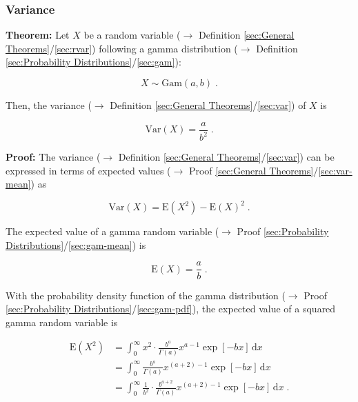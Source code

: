 \documentclass[a4paper,12pt,twoside]{book}
\begin{document}
\subsubsection[\textbf{Variance}]{Variance} \label{sec:gam-var}
\setcounter{equation}{0}

\textbf{Theorem:} Let $X$ be a random variable ($\rightarrow$ Definition \ref{sec:General Theorems}/\ref{sec:rvar}) following a gamma distribution ($\rightarrow$ Definition \ref{sec:Probability Distributions}/\ref{sec:gam}):

\begin{equation} \label{eq:gam-var-gam}
X \sim \mathrm{Gam}(a, b) \; .
\end{equation}

Then, the variance ($\rightarrow$ Definition \ref{sec:General Theorems}/\ref{sec:var}) of $X$ is

\begin{equation} \label{eq:gam-var-gam-var}
\mathrm{Var}(X) = \frac{a}{b^2} \; .
\end{equation}


\vspace{1em}
\textbf{Proof:} The variance ($\rightarrow$ Definition \ref{sec:General Theorems}/\ref{sec:var}) can be expressed in terms of expected values ($\rightarrow$ Proof \ref{sec:General Theorems}/\ref{sec:var-mean}) as

\begin{equation} \label{eq:gam-var-var-mean}
\mathrm{Var}(X) = \mathrm{E}(X^2) - \mathrm{E}(X)^2 \; .
\end{equation}

The expected value of a gamma random variable ($\rightarrow$ Proof \ref{sec:Probability Distributions}/\ref{sec:gam-mean}) is

\begin{equation} \label{eq:gam-var-gam-mean}
\mathrm{E}(X) = \frac{a}{b} \; .
\end{equation}

With the probability density function of the gamma distribution ($\rightarrow$ Proof \ref{sec:Probability Distributions}/\ref{sec:gam-pdf}), the expected value of a squared gamma random variable is

\begin{equation} \label{eq:gam-var-gam-sqr-mean-s1}
\begin{split}
\mathrm{E}(X^2) &= \int_{0}^{\infty} x^2 \cdot \frac{b^a}{\Gamma(a)} x^{a-1} \exp[-b x] \, \mathrm{d}x \\
&= \int_{0}^{\infty} \frac{b^a}{\Gamma(a)} x^{(a+2)-1} \exp[-b x] \, \mathrm{d}x \\
&= \int_{0}^{\infty} \frac{1}{b^2} \cdot \frac{b^{a+2}}{\Gamma(a)} x^{(a+2)-1} \exp[-b x] \, \mathrm{d}x \; .
\end{split}
\end{equation}
\end{document}
